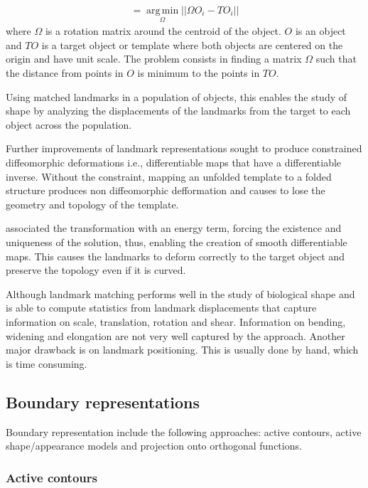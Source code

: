 \begin{eqnarray}
  [\hat{\Omega}] = \operatorname*{arg\,min}_{\Omega} || \Omega O_i - TO_i||
  \label{equ:align1}
\end{eqnarray}
where $\Omega$ is a rotation matrix around the centroid of the object.
$O$ is an object and $TO$ is a target object or template where both objects are centered on the origin and have unit scale.
The problem consists in finding a matrix $\Omega$ such that the distance from points in $O$ is minimum
to the points in $TO$.

Using matched landmarks 
in a population of objects, this enables the study of shape by 
analyzing the displacements of the landmarks from the target to each object across the population. 

Further improvements of landmark representations sought to produce constrained diffeomorphic deformations i.e., 
differentiable maps that have a differentiable inverse. 
Without the constraint, mapping an unfolded template to a folded structure 
produces non diffeomorphic defformation and
causes to lose the geometry and topology of the template.

\cite{joshi2000landmark} associated the transformation with an energy term,
forcing the existence and uniqueness of the solution, 
thus, enabling the creation of smooth differentiable maps.
This causes the landmarks to deform correctly to the target object and preserve the topology even if 
it is curved. 

Although landmark matching performs well in the study of biological shape and
is able to compute statistics from landmark displacements that 
capture information on scale, translation, rotation and shear.
Information on bending, widening and elongation 
are not very well captured by the approach.
Another major drawback is on landmark positioning.
This is usually done by hand, which is time consuming. 

\subsection{Boundary representations} 

Boundary representation include the following approaches: active contours, active shape/appearance models and projection onto orthogonal functions.

\subsubsection{Active contours} 

